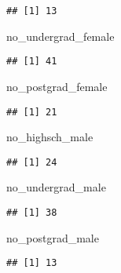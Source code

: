 \documentclass[
]{article}
\newenvironment{Shaded}{\begin{snugshade}}{\end{snugshade}}
\newcommand{\NormalTok}[1]{#1}
\begin{document}
\begin{verbatim}
## [1] 13
\end{verbatim}

\begin{Shaded}
\begin{Highlighting}[]
\NormalTok{no\_undergrad\_female}
\end{Highlighting}
\end{Shaded}

\begin{verbatim}
## [1] 41
\end{verbatim}

\begin{Shaded}
\begin{Highlighting}[]
\NormalTok{no\_postgrad\_female}
\end{Highlighting}
\end{Shaded}

\begin{verbatim}
## [1] 21
\end{verbatim}

\begin{Shaded}
\begin{Highlighting}[]
\NormalTok{no\_highsch\_male}
\end{Highlighting}
\end{Shaded}

\begin{verbatim}
## [1] 24
\end{verbatim}

\begin{Shaded}
\begin{Highlighting}[]
\NormalTok{no\_undergrad\_male}
\end{Highlighting}
\end{Shaded}

\begin{verbatim}
## [1] 38
\end{verbatim}

\begin{Shaded}
\begin{Highlighting}[]
\NormalTok{no\_postgrad\_male}
\end{Highlighting}
\end{Shaded}

\begin{verbatim}
## [1] 13
\end{verbatim}
\end{document}
